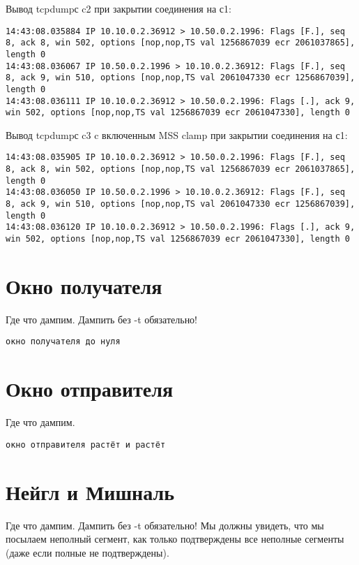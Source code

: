 \documentclass[a4paper,12pt]{article}
\begin{document}
Вывод tcpdumpс c2 при закрытии соединения на с1:
\begin{Verbatim}
14:43:08.035884 IP 10.10.0.2.36912 > 10.50.0.2.1996: Flags [F.], seq 8, ack 8, win 502, options [nop,nop,TS val 1256867039 ecr 2061037865], length 0
14:43:08.036067 IP 10.50.0.2.1996 > 10.10.0.2.36912: Flags [F.], seq 8, ack 9, win 510, options [nop,nop,TS val 2061047330 ecr 1256867039], length 0
14:43:08.036111 IP 10.10.0.2.36912 > 10.50.0.2.1996: Flags [.], ack 9, win 502, options [nop,nop,TS val 1256867039 ecr 2061047330], length 0
\end{Verbatim}

Вывод tcpdumpс c3 c включенным MSS clamp при закрытии соединения на с1:
\begin{Verbatim}
14:43:08.035905 IP 10.10.0.2.36912 > 10.50.0.2.1996: Flags [F.], seq 8, ack 8, win 502, options [nop,nop,TS val 1256867039 ecr 2061037865], length 0
14:43:08.036050 IP 10.50.0.2.1996 > 10.10.0.2.36912: Flags [F.], seq 8, ack 9, win 510, options [nop,nop,TS val 2061047330 ecr 1256867039], length 0
14:43:08.036120 IP 10.10.0.2.36912 > 10.50.0.2.1996: Flags [.], ack 9, win 502, options [nop,nop,TS val 1256867039 ecr 2061047330], length 0
\end{Verbatim}

\section{Окно получателя}

Где что дампим.  Дампить без -t обязательно!

\begin{Verbatim}
окно получателя до нуля
\end{Verbatim}

\section{Окно отправителя}

Где что дампим.

\begin{Verbatim}
окно отправителя растёт и растёт
\end{Verbatim}

\section{Нейгл и Мишналь}

Где что дампим.  Дампить без -t обязательно!
Мы должны увидеть, что мы посылаем неполный сегмент, как только подтверждены все неполные сегменты (даже если полные не подтверждены).
\end{document}
